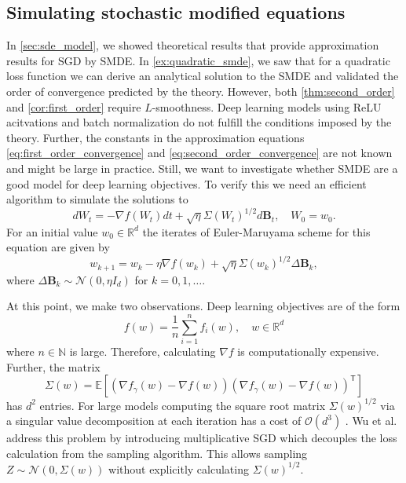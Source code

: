 \documentclass[12pt]{article}
\theoremstyle{definition}
\numberwithin{equation}{section}
\newcommand{\N}{\mathbb{N}}
\newcommand{\R}{\mathbb{R}}
\newcommand{\CN}{\mathcal{N}}
\newcommand{\CO}{\mathcal{O}}
\newcommand{\T}{\mathsf{T}}
\newcommand{\ev}[1]{\mathbb{E}\left[{#1}\right]}
\begin{document}
\subsection{Simulating stochastic modified equations}
In \autoref{sec:sde_model}, we showed theoretical results that provide approximation results for SGD by SMDE. 
In \autoref{ex:quadratic_smde}, we saw that for a quadratic loss function we can derive an analytical solution to the SMDE and validated the order of convergence predicted by the theory.
However, both \autoref{thm:second_order} and \autoref{cor:first_order} require $L$-smoothness. Deep learning models using ReLU acitvations and batch normalization do not fulfill the conditions imposed by the theory. Further, the constants in the approximation equations \eqref{eq:first_order_convergence} and \eqref{eq:second_order_convergence} are not known and might be large in practice. 
Still, we want to investigate whether SMDE are a good model for deep learning objectives. To verify this we need an efficient algorithm to simulate the solutions to 
\begin{equation}
  d W_t = -\nabla f(W_t) dt + \sqrt{\eta}\Sigma(W_t)^{1/2}d\mathbf{B}_t, \quad W_0 = w_0.
\end{equation}
For an initial value $w_0 \in \R^d$ the iterates of Euler-Maruyama scheme for this equation are given by 
\begin{equation}
  w_{k+1} = w_k -\eta\nabla f(w_k) + \sqrt{\eta}\Sigma(w_k)^{1/2} \Delta \mathbf{B}_k,
\end{equation} 
where $\Delta \mathbf{B}_k \sim \CN(0, \eta I_d)$ for $k=0,1,\dots$.

At this point, we make two observations. Deep learning objectives are of the form
\begin{equation*}
  f(w) = \frac{1}{n}\sum_{i=1}^n f_i(w), \quad w \in \R^d
\end{equation*}
where $n \in \N$ is large. Therefore, calculating $\nabla f$ is computationally expensive. Further, the matrix
\begin{equation*}
  \Sigma(w)= \ev{(\nabla f_{\gamma}(w) - \nabla f(w))(\nabla f_{\gamma}(w) - \nabla f(w))^\T}
\end{equation*}
has $d^2$ entries. For large models computing the square root matrix $\Sigma(w)^{1/2}$ via a singular value decomposition at each iteration has a cost of $\CO(d^3)$ \cite{golubMatrixComputations1996}.
Wu et al. \cite{wuNoisyGradientDescent2020a} address this problem by introducing multiplicative SGD which decouples the loss calculation from the sampling algorithm. This allows sampling $Z \sim \CN(0, \Sigma(w))$ without explicitly calculating $\Sigma(w)^{1/2}$.
\end{document}
